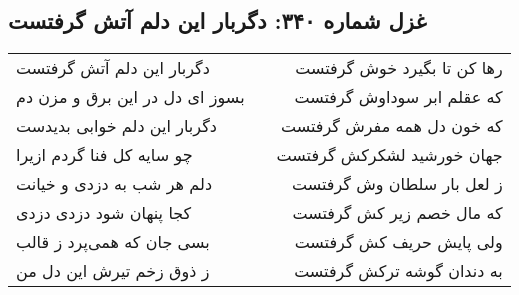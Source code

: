 \begin{center}
\section*{غزل شماره ۳۴۰: دگربار این دلم آتش گرفتست}
\label{sec:0340}
\begin{longtable}{l p{0.5cm} r}
دگربار این دلم آتش گرفتست
&&
رها کن تا بگیرد خوش گرفتست
\\
بسوز ای دل در این برق و مزن دم
&&
که عقلم ابر سوداوش گرفتست
\\
دگربار این دلم خوابی بدیدست
&&
که خون دل همه مفرش گرفتست
\\
چو سایه کل فنا گردم ازیرا
&&
جهان خورشید لشکرکش گرفتست
\\
دلم هر شب به دزدی و خیانت
&&
ز لعل بار سلطان وش گرفتست
\\
کجا پنهان شود دزدی دزدی
&&
که مال خصم زیر کش گرفتست
\\
بسی جان که همی‌پرد ز قالب
&&
ولی پایش حریف کش گرفتست
\\
ز ذوق زخم تیرش این دل من
&&
به دندان گوشه ترکش گرفتست
\\
\end{longtable}
\end{center}
